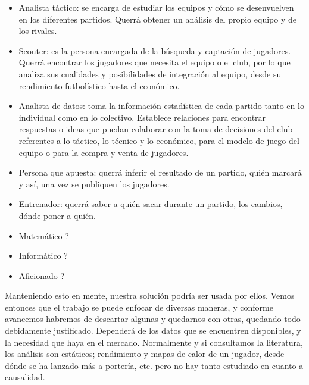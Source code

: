 \begin{itemize}
    \item Analista táctico: se encarga de estudiar los equipos y cómo 
    se desenvuelven en los diferentes partidos. Querrá obtener un análisis 
    del propio equipo y de los rivales.
    \item Scouter: es la persona encargada de la búsqueda y captación 
    de jugadores. Querrá encontrar los jugadores que necesita el equipo 
    o el club, por lo que analiza sus cualidades y posibilidades de 
    integración al equipo, desde su rendimiento futbolístico hasta el 
    económico.
    \item Analista de datos: toma la información estadística de 
    cada partido tanto en lo individual como en lo colectivo. 
    Establece relaciones para encontrar respuestas o ideas que 
    puedan colaborar con la toma de decisiones del club referentes 
    a lo táctico, lo técnico y lo económico, para el modelo de 
    juego del equipo o para la compra y venta de jugadores.
    \item Persona que apuesta: querrá inferir el resultado de un partido, 
    quién marcará y así, una vez se publiquen los jugadores. 
    \item Entrenador: querrá saber a quién sacar durante un partido, los 
    cambios, dónde poner a quién.
    \item Matemático ?
    \item Informático ?
    \item Aficionado  ?
\end{itemize}

Manteniendo esto en mente, nuestra solución 
podría ser usada por ellos. Vemos entonces 
que el trabajo se puede enfocar de diversas 
maneras, y conforme avancemos habremos de descartar algunas y 
quedarnos con otras, quedando todo debidamente justificado. Dependerá de los 
datos que se encuentren disponibles, y la necesidad que haya en el mercado. 
Normalmente y si consultamos la literatura, los análisis son estáticos; 
rendimiento y mapas de calor de un jugador, desde dónde se ha lanzado más 
a portería, etc. pero no hay tanto estudiado en cuanto a causalidad.